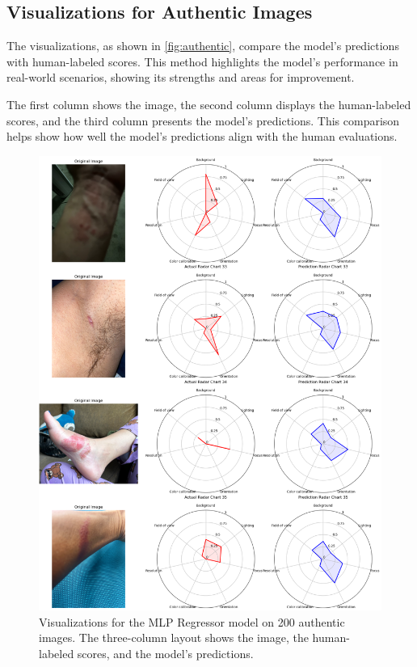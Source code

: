 \subsection{Visualizations for Authentic Images}
\label{subsec:AuthenticImages}
The visualizations, as shown in \autoref{fig:authentic}, compare the model's predictions with human-labeled scores. This method highlights the model's performance in real-world scenarios, showing its strengths and areas for improvement. \par
\vspace{\baselineskip}
\noindent
The first column shows the image, the second column displays the human-labeled scores, and the third column presents the model’s predictions. This comparison helps show how well the model’s predictions align with the human evaluations. \par
\begin{figure}[ht]
    \centering
    \includegraphics[keepaspectratio,width=15cm]{img/authentic.png}
    \caption{Visualizations for the MLP Regressor model on 200 authentic images. The three-column layout shows the image, the human-labeled scores, and the model's predictions.}
    \label{fig:authentic}
\end{figure}
\clearpage
